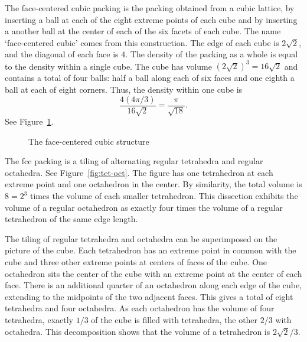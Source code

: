 The face-centered cubic packing is the packing obtained from a cubic
lattice, by inserting a ball at each of the eight extreme points of
each cube and by inserting a another ball at the center of each
of the six facets of each cube.  The name `face-centered cubic' comes from this
construction.  The edge of each cube is $2\sqrt2$, and the diagonal of
each face is $4$.  
  The density of the packing as a whole 
is equal to the density within a single cube.  The cube has volume
$(2\sqrt2)^3 = 16\sqrt2$  and contains a total of four balls: half a
ball along each of six faces and one eighth a ball at each of eight
corners.  Thus, the density within one cube is
   \begin{displaymath}
   \frac{   4 (4\pi/3)}{16\sqrt2} = \frac{\pi}{\sqrt{18}}.
   \end{displaymath}
See Figure~\ref{fig:fcc-cube}.

\begin{figure}[htb]
  \centering
  \caption{The face-centered cubic structure}
  \label{fig:fcc-cube}
\end{figure}


The fcc packing is a tiling of alternating regular tetrahedra and
regular octahedra.  See Figure~\ref{fig:tet-oct}.  The figure has one
tetrahedron at each extreme point and one octahedron in the center. By
similarity, the total volume is $8 = 2^3$ times the volume of each
smaller tetrahedron. This dissection exhibits the volume of a regular
octahedron as exactly four times the volume of a regular tetrahedron
of the same edge length.

The tiling of regular tetrahedra and octahedra can be
superimposed on the picture of the cube.  Each tetrahedron has an extreme point
in common with the cube and three other extreme points at centers of faces
of the cube.   One octahedron sits the center of the cube with an extreme
point at the center of each face.  There is an
additional quarter of an octahedron along each edge of the cube, extending to the
midpoints of the two adjacent faces.  This gives a total of eight
tetrahedra and four octahedra.  As each octahedron has the volume of
four tetrahedra, exactly $1/3$ of the cube is filled with tetrahedra,
the other $2/3$ with octahedra.  This decomposition shows that the
volume of a tetrahedron is $2\sqrt2/3$.

